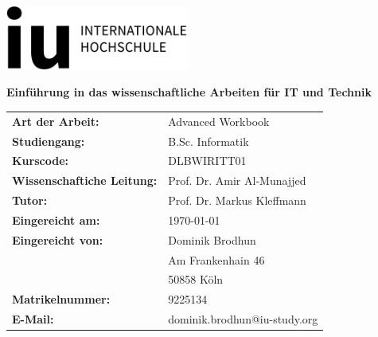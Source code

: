 \begin{titlepage}
	\thispagestyle{empty}

	\begin{flushright}
		\includegraphics[width=6cm]{logo.jpg}
	\end{flushright}

	\vfill

	\begin{center}
		{\huge\bfseries Einführung in das wissenschaftliche Arbeiten für IT und Technik\par}
	\end{center}

	\vfill

	\begin{tabular}{@{}l l}
		\textbf{Art der Arbeit:}           & Advanced Workbook            \\
		\textbf{Studiengang:}              & B.Sc. Informatik             \\
		\textbf{Kurscode:}                 & DLBWIRITT01                  \\
		\textbf{Wissenschaftiche Leitung:} & Prof. Dr. Amir Al-Munajjed   \\
		\textbf{Tutor:}                    & Prof. Dr. Markus Kleffmann   \\[2em]
		\textbf{Eingereicht am:}           & \today                       \\[2em]
		\textbf{Eingereicht von:}          & Dominik Brodhun              \\
		                                   & Am Frankenhain 46            \\
		                                   & 50858 Köln                   \\[0.5em]
		\textbf{Matrikelnummer:}           & 9225134                      \\
		\textbf{E-Mail:}                   & dominik.brodhun@iu-study.org \\
	\end{tabular}
\end{titlepage}
